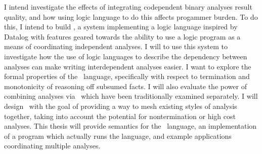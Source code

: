 {\fontsize{10}{12}\selectfont
I intend investigate the effects of integrating codependent binary analyses result quality, and how using logic language to do this affects progammer burden.
To do this, I intend to build \sysname, a system implementing a logic language inspired by Datalog with features geared towards the ability to use a logic program as a means of coordinating independent analyses.
I will to use this system to investigate how the use of logic languages to describe the dependency between analyses can make writing interdependent analyses easier.
I want to explore the formal properties of the \sysname\ language, specifically with respect to termination and monotonicity of reasoning off subsumed facts.
I will also evaluate the power of combining analyses via \sysname\ which have been traditionally examined separately.
I will design \sysname\ with the goal of providing a way to mesh existing styles of analysis together, taking into account the potential for nontermination or high cost analyses.
This thesis will provide semantics for the \sysname\ language, an implementation of a program which actually runs the language, and example applications coordinating multiple analyses.
}
